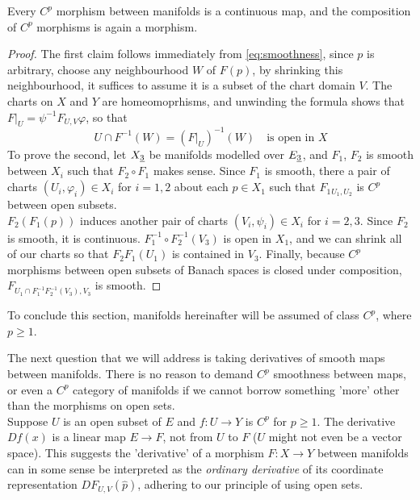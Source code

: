\documentclass[../main-manifolds.tex]{subfiles}
\begin{document}
\begin{wts}\label{prop:smoothness-implies-cont-functorality}
    Every $C^p$ morphism between manifolds is a continuous map, and the composition of $C^p$ morphisms is again a morphism.
\end{wts}
\begin{proof}
    The first claim follows immediately from \cref{eq:smoothness}, since $p$ is arbitrary, choose any neighbourhood $W$ of $F(p)$, by shrinking this neighbourhood, it suffices to assume it is a subset of the chart domain $V$. The charts on $X$ and $Y$ are homeomoprhisms, and unwinding the formula shows that $F\vert_{U} = \psi^{-1}F_{U,V}\varphi$, so that
    \[
        U\cap F^{-1}(W) = (F\vert_U)^{-1}(W)\quad\text{is open in }X
    \]
    To prove the second, let $\UL{X}[3]$ be manifolds modelled over $\UL{E}[3]$, and $F_1$, $F_2$ is smooth between $X_i$ such that $F_2\circ F_1$ makes sense. Since $F_1$ is smooth, there a pair of charts $(U_i,\varphi_i)\in X_i$ for $i = 1,2$ about each $p\in X_1$ such that $F_1{_{U_1,U_2}}$ is $C^p$ between open subsets.\\

    $F_2(F_1(p))$ induces another pair of charts $(V_i,\psi_i)\in X_i$ for $i=2,3$. Since $F_2$ is smooth, it is continuous. $F_1^{-1}\circ F_2^{-1}(V_3)$ is open in $X_1$, and we can shrink all of our charts so that $F_2F_1(U_1)$ is contained in $V_3$. Finally, because $C^p$ morphisms between open subsets of Banach spaces is closed under composition, $F_{U_1\cap F_1^{-1}F_2^{-1}(V_3), V_3}$ is smooth.
\end{proof}
\begin{remark}
    To conclude this section, manifolds hereinafter will be assumed of class $C^p$, where $p\geq 1$. 
\end{remark}
The next question that we will address is taking derivatives of smooth maps between manifolds. There is no reason to demand $C^p$ smoothness between maps, or even a $C^p$ category of manifolds if we cannot borrow something 'more' other than the morphisms on open sets.\\

Suppose $U$ is an open subset of $E$ and $f: U\to Y$ is $C^p$ for $p\geq 1$. The derivative $Df(x)$ is a linear map $E\to F$, not from $U$ to $F$ ($U$ might not even be a vector space). This suggests the 'derivative' of a morphism $F: X\to Y$ between manifolds can in some sense be interpreted as the \emph{ordinary derivative} of its coordinate representation $DF_{U,V}(\hat{p})$, adhering to our principle of using open sets.\\
\end{document}
